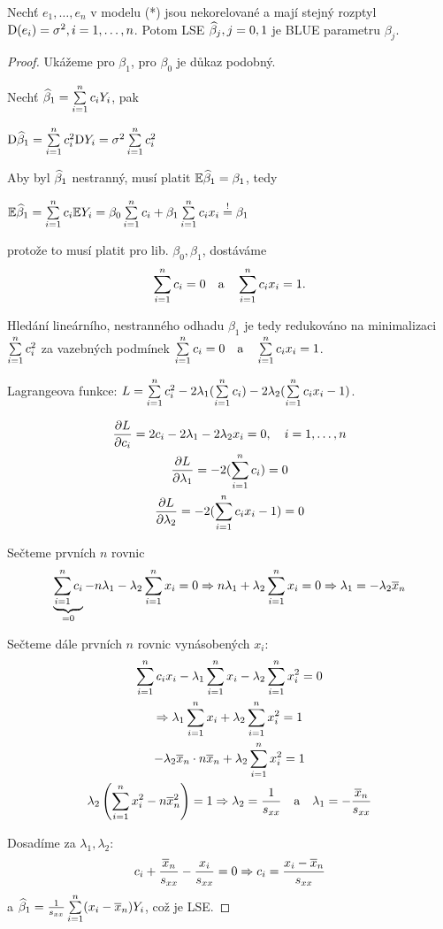 \begin{theorem}
	Nechť $e_1, \dots, e_n$ v modelu (*) jsou nekorelované a mají stejný rozptyl $\mathrm{D}(e_i) = \sigma^2, i = 1, \dots, n$. Potom LSE $\widehat{\beta}_j, j = 0,1$ je BLUE parametru $\beta_j$.
\end{theorem}

\newcommand{\pd}{\delta}

\begin{proof}
	Ukážeme pro $\beta_1$, pro $\beta_0$ je důkaz podobný.
	
	Nechť $\widehat{\beta}_1 = \sum\limits_{i=1}^{n} c_i Y_i$, pak
	
	$\mathrm{D} \widehat{\beta}_1 = \sum\limits_{i=1}^{n} c_i^2 \mathrm{D} Y_i = \sigma^2 \sum\limits_{i=1}^{n} c_i^2$
	
	Aby byl $\widehat{\beta}_1$ nestranný, musí platit $\mathbb{E} \widehat{\beta}_1 = \beta_1$, tedy
	
	$\mathbb{E} \widehat{\beta}_1 = \sum\limits_{i=1}^{n} c_i \mathbb{E} Y_i = \beta_0 \sum\limits_{i=1}^{n} c_i + \beta_1 \sum\limits_{i=1}^{n} c_i x_i \overset{!}{=} \beta_1$
	
	protože to musí platit pro lib. $\beta_0, \beta_1$, dostáváme
	$$
		\sum\limits_{i=1}^{n} c_i = 0 \quad \text{a} \quad \sum\limits_{i=1}^{n} c_i x_i = 1.
	$$
	
	Hledání lineárního, nestranného odhadu $\beta_1$ je tedy redukováno na minimalizaci $\sum\limits_{i=1}^{n} c_i^2$ za vazebných podmínek $\sum\limits_{i=1}^{n} c_i = 0 \quad \text{a} \quad \sum\limits_{i=1}^{n} c_i x_i = 1$.
	
	Lagrangeova funkce: $L = \sum\limits_{i=1}^{n} c_i^2 - 2 \lambda_1 (\sum\limits_{i=1}^{n} c_i) - 2 \lambda_2 (\sum\limits_{i=1}^{n} c_i x_i - 1)$.
	
	\begin{gather*}
		\frac{\partial L}{\partial c_i} = 2 c_i - 2 \lambda_1 - 2 \lambda_2 x_i = 0, \quad i = 1, \dots, n \\
		\frac{\partial L}{\partial \lambda_1} = -2 (\sum\limits_{i=1}^{n} c_i) = 0 \\
		\frac{\partial L}{\partial \lambda_2} = -2 (\sum\limits_{i=1}^{n} c_i x_i - 1) = 0
	\end{gather*}
	
	Sečteme prvních $n$ rovnic
	$$
		\underbrace{\sum\limits_{i=1}^{n} c_i}_{= 0} - n \lambda_1 - \lambda_2 \sum\limits_{i=1}^{n} x_i = 0 \Rightarrow n\lambda_1 + \lambda_2 \sum\limits_{i=1}^{n} x_i = 0 \Rightarrow \lambda_1 = - \lambda_2 \overline{x}_n
	$$
	
	Sečteme dále prvních $n$ rovnic vynásobených $x_i$:
	\begin{gather*}
		\sum\limits_{i=1}^{n} c_i x_i - \lambda_1 \sum\limits_{i=1}^{n} x_i - \lambda_2 \sum\limits_{i=1}^{n} x_i^2 = 0 \\
		\Rightarrow \lambda_1 \sum\limits_{i=1}^{n} x_i + \lambda_2 \sum\limits_{i=1}^{n} x_i^2 = 1 \\
		 -\lambda_2 \overline{x}_n \cdot n \overline{x}_n + \lambda_2 \sum\limits_{i=1}^{n} x_i^2 = 1 \\
		 \lambda_2 \left( \sum\limits_{i=1}^{n} x_i^2 - n \overline{x}_n^2 \right) = 1 \Rightarrow \lambda_2 = \frac{1}{s_{xx}} \quad \text{a} \quad \lambda_1 = - \frac{\overline{x}_n}{s_{xx}}
	\end{gather*}
	
	Dosadíme za $\lambda_1, \lambda_2$:
	$$
		c_i + \frac{\overline{x}_n}{s_{xx}} - \frac{x_i}{s_{xx}} = 0 \Rightarrow c_i = \frac{x_i - \overline{x}_n}{s_{xx}}
	$$
	a $\widehat{\beta}_1 = \frac{1}{s_{xx}} \sum\limits_{i=1}^{n} (x_i - \overline{x}_n) Y_i$, což je LSE.

\end{proof}

